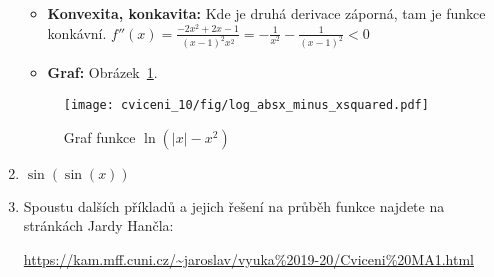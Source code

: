 \begin{enumerate}
{\begin{itemize}
					Pro $x \in (1/2, 1)$ platí $f'(x) < 0$, tedy $f$ je tam klesající.

					Tedy v $x = 1/2$ je lokální maximum (které je i globálním maximem).

				\item  \textbf{Konvexita, konkavita:}
					Kde je druhá derivace záporná, tam je funkce konkávní.
					$f''(x) = \frac{-2x^2 + 2x - 1}{(x-1)^2x^2} = -\frac{1}{x^2} - \frac{1}{(x-1)^2} < 0$

				\item  \textbf{Graf:} Obrázek~\ref{fig:log_absx_minux_xsquared}.

			\end{itemize}
			\begin{figure}[H]
				\centering
				\texttt{[image: cviceni\_10/fig/log\_absx\_minus\_xsquared.pdf]}
				\caption{Graf funkce $\ln(|x| - x^2)$}
				\label{fig:log_absx_minux_xsquared}
			\end{figure}
		}

	\item  $\sin(\sin(x))$


	\item  Spoustu dalších příkladů a jejich řešení na průběh funkce najdete na stránkách Jardy Hančla:

		\url{https://kam.mff.cuni.cz/~jaroslav/vyuka\%2019-20/Cviceni\%20MA1.html}

\end{enumerate}

